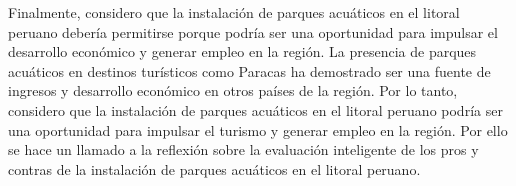 \documentclass{article}
\begin{document}
\newpage

Finalmente, considero que la instalación de parques acuáticos en el litoral peruano debería permitirse porque podría ser una oportunidad para impulsar el desarrollo económico y generar empleo en la región. La presencia de parques acuáticos en destinos turísticos como Paracas ha demostrado ser una fuente de ingresos y desarrollo económico en otros países de la región. Por lo tanto, considero que la instalación de parques acuáticos en el litoral peruano podría ser una oportunidad para impulsar el turismo y generar empleo en la región. Por ello se hace un llamado a la reflexión sobre la evaluación inteligente de los pros y contras de la instalación de parques acuáticos en el litoral peruano.
  
\end{document}
